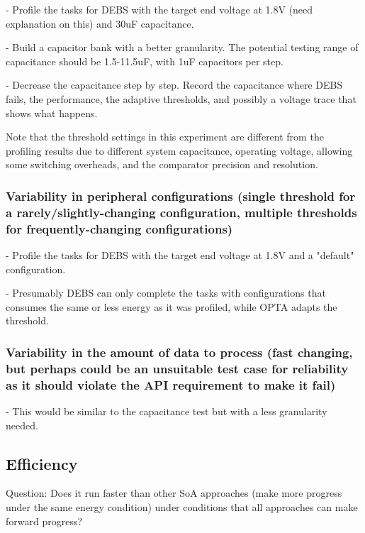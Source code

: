 - Profile the tasks for DEBS with the target end voltage at 1.8V (need explanation on this) and 30uF capacitance. 

- Build a capacitor bank with a better granularity. The potential testing range of capacitance should be 1.5-11.5uF, with 1uF capacitors per step. 

- Decrease the capacitance step by step. Record the capacitance where DEBS fails, the performance, the adaptive thresholds, and possibly a voltage trace that shows what happens. 

Note that the threshold settings in this experiment are different from the profiling results due to different system capacitance, operating voltage, allowing some switching overheads, and the comparator precision and resolution. 

\subsubsection{Variability in peripheral configurations (single threshold for a rarely/slightly-changing configuration, multiple thresholds for frequently-changing configurations)}



- Profile the tasks for DEBS with the target end voltage at 1.8V and a "default" configuration. 
    
- Presumably DEBS can only complete the tasks with configurations that consumes the same or less energy as it was profiled, while OPTA adapts the threshold. 

\subsubsection{Variability in the amount of data to process (fast changing, but perhaps could be an unsuitable test case for reliability as it should violate the API requirement to make it fail)}
    
- This would be similar to the capacitance test but with a less granularity needed.

\subsection{Efficiency}

Question: Does it run faster than other SoA approaches (make more progress under the same energy condition) under conditions that all approaches can make forward progress?

